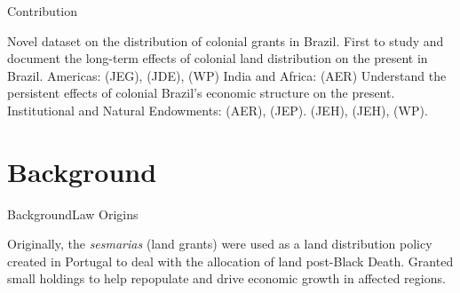 \documentclass[aspectratio=1610]{beamer}
\begin{document}
\begin{frame}{Contribution}
    \begin{outline}
        \1 Novel dataset on the distribution of colonial grants in Brazil.
        \vspace{2mm}
        \1 First to study and document the long-term effects of colonial land distribution on the present in Brazil.
        \vspace{2mm}
            \2 Americas: 
            \cite{Wigton-Jones2020-ex} (JEG),
            \cite{Sellars2018-yp} (JDE),
            \cite{Smith2023-ip} (WP)
            \vspace{2mm}
            \2 India and Africa: 
            \cites{Banerjee2005-ki} (AER)
        \vspace{2mm}
        \1 Understand the persistent effects of colonial Brazil's economic structure on the present.
        \vspace{2mm}
        \2 Institutional and Natural Endowments: 
        \cite{Acemoglu2001-dz} (AER), 
        \cite{Sokoloff2000-mb} (JEP).
        \vspace{2mm}
        \2 
        \cite{Naritomi2012-or} (JEH), 
        \cite{Musacchio2014-pq} (JEH),
        \cite{Laudares2022-vy} (WP). 
    \end{outline}
\end{frame}


\section{Background}

\begin{frame}{Background}{Law Origins}
    \begin{outline}
        \1 Originally, the \textit{sesmarias} (land grants) were used as a land distribution policy created in Portugal to deal with the allocation of land post-Black Death.
        \vspace{2mm}
        \1 Granted small holdings to help repopulate and drive economic growth in affected regions.
    \end{outline}
\end{frame}
\end{document}
